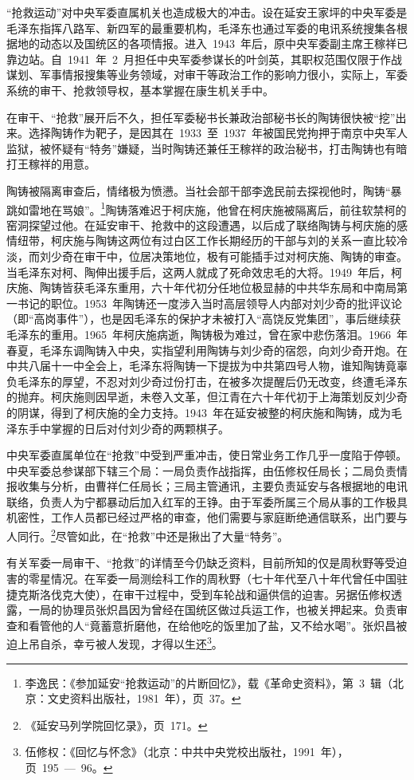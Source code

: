 “抢救运动”对中央军委直属机关也造成极大的冲击。设在延安王家坪的中央军委是毛泽东指挥八路军、新四军的最重要机构，毛泽东也通过军委的电讯系统搜集各根据地的动态以及国统区的各项情报。进入~1943~年后，原中央军委副主席王稼祥已靠边站。自~1941~年~2~月担任中央军委参谋长的叶剑英，其职权范围仅限于作战谋划、军事情报搜集等业务领域，对审干等政治工作的影响力很小，实际上，军委系统的审干、抢救领导权，基本掌握在康生机关手中。

在审干、“抢救”展开后不久，担任军委秘书长兼政治部秘书长的陶铸很快被“挖”出来。选择陶铸作为靶子，是因其在~1933~至~1937~年被国民党拘押于南京中央军人监狱，被怀疑有“特务”嫌疑，当时陶铸还兼任王稼祥的政治秘书，打击陶铸也有暗打王稼祥的用意。

陶铸被隔离审查后，情绪极为愤懑。当社会部干部李逸民前去探视他时，陶铸“暴跳如雷地在骂娘”。\footnote{李逸民：《参加延安“抢救运动”的片断回忆》，载《革命史资料》，第~3~辑（北京：文史资料出版社，1981~年），页~37。}陶铸落难迟于柯庆施，他曾在柯庆施被隔离后，前往软禁柯的窑洞探望过他。在延安审干、抢救中的这段遭遇，以后成了联络陶铸与柯庆施的感情纽带，柯庆施与陶铸这两位有过白区工作长期经历的干部与刘的关系一直比较冷淡，而刘少奇在审干中，位居决策地位，极有可能插手过对柯庆施、陶铸的审查。当毛泽东对柯、陶伸出援手后，这两人就成了死命效忠毛的大将。1949~年后，柯庆施、陶铸皆获毛泽东重用，六十年代初分任地位极显赫的中共华东局和中南局第一书记的职位。1953~年陶铸还一度涉入当时高层领导人内部对刘少奇的批评议论（即“高岗事件”），也是因毛泽东的保护才未被打入“高饶反党集团”，事后继续获毛泽东的重用。1965~年柯庆施病逝，陶铸极为难过，曾在家中悲伤落泪。1966~年春夏，毛泽东调陶铸入中央，实指望利用陶铸与刘少奇的宿怨，向刘少奇开炮。在中共八届十一中全会上，毛泽东将陶铸一下提拔为中共第四号人物，谁知陶铸竟辜负毛泽东的厚望，不忍对刘少奇过份打击，在被多次提醒后仍无改变，终遭毛泽东的抛弃。柯庆施则因早逝，未卷入文革，但江青在六十年代初于上海策划反刘少奇的阴谋，得到了柯庆施的全力支持。1943~年在延安被整的柯庆施和陶铸，成为毛泽东手中掌握的日后对付刘少奇的两颗棋子。

中央军委直属单位在“抢救”中受到严重冲击，使日常业务工作几乎一度陷于停顿。中央军委总参谋部下辖三个局：一局负责作战指挥，由伍修权任局长；二局负责情报收集与分析，由曹祥仁任局长；三局主管通讯，主要负责延安与各根据地的电讯联络，负责人为宁都暴动后加入红军的王铮。由于军委所属三个局从事的工作极具机密性，工作人员都已经过严格的审查，他们需要与家庭断绝通信联系，出门要与人同行。\footnote{《延安马列学院回忆录》，页~171。}尽管如此，在“抢救”中还是揪出了大量“特务”。

有关军委一局审干、“抢救”的详情至今仍缺乏资料，目前所知的仅是周秋野等受迫害的零星情况。在军委一局测绘科工作的周秋野（七十年代至八十年代曾任中国驻捷克斯洛伐克大使），在审干过程中，受到车轮战和逼供信的迫害。另据伍修权透露，一局的协理员张炽昌因为曾经在国统区做过兵运工作，也被关押起来。负责审查和看管他的人“竟蓄意折磨他，在给他吃的饭里加了盐，又不给水喝”。张炽昌被迫上吊自杀，幸亏被人发现，才得以生还\footnote{伍修权：《回忆与怀念》（北京：中共中央党校出版社，1991~年），页~195~—~96。}。

